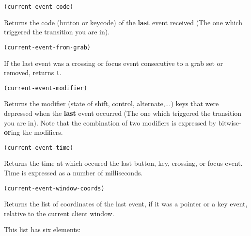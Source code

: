         
{\usagefont\begin{verbatim}
(current-event-code)
\end{verbatim}}\usageupspace

Returns the code (button or keycode) of the {\bf last} event received (The
one which triggered the transition you are in).

        
{\usagefont\begin{verbatim}
(current-event-from-grab)
\end{verbatim}}\usageupspace

If the last event was a crossing or focus event consecutive to a grab set or
removed, returns \verb"t".

        
{\usagefont\begin{verbatim}
(current-event-modifier)
\end{verbatim}}\usageupspace

Returns the modifier (state of shift, control, alternate,...) keys that were
depressed when the {\bf last} event occurred (The one which triggered the
transition you are in).  Note that the combination of two modifiers is
expressed by bitwise-{\bf or}ing the modifiers.


{\usagefont\begin{verbatim}
(current-event-time)
\end{verbatim}}\usageupspace

Returns the time at which occured the last button, key, crossing, or focus 
event. Time is expressed as a number of milliseconds.

        
{\usagefont\begin{verbatim}
(current-event-window-coords)
\end{verbatim}}\usageupspace

Returns the list of coordinates of the last event, if it was a
pointer or a key event, relative to the current client window.

This list has six elements:

